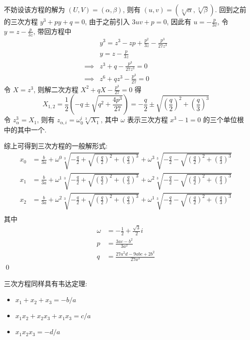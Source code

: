 \begin{solution}
不妨设该方程的解为 $(U, V) = (\alpha, \beta)$, 则有 $(u, v) = (\sqrt[3]{\alpha}, \sqrt[3]{\beta})$. 回到之前的三次方程 $y^3 + py + q = 0$, 由于之前引入 $3uv + p = 0$, 因此有 $u = -\frac{p}{3v}$, 令 $y = z - \frac{p}{3z}$, 带回方程中
\[ \begin{aligned}
    & y^3 = z^3 - zp + \frac{p^2}{3z} - \frac{p^3}{27z^3} \\
    & y = z - \frac{p}{3z} \\
    \implies & z^3 + q - \frac{p^3}{27z^3} = 0 \\
    \implies & z^6 + qz^3 - \frac{p^3}{27} = 0
\end{aligned} \]
令 $X = z^3$, 则解二次方程 $X^2 + qX - \frac{p^3}{27} = 0$ 得
\[
X_{1, 2} = \frac12 (-q \pm \sqrt{q^2 + \frac{4p^3}{27}}) = -\frac{q}{2} \pm \sqrt{(\frac{q}{2})^2 + (\frac{q}{3})^3}
\]
令 $z_\alpha^3 = X_1$, 则有 $z_{\alpha, i} = \omega^i_0 \sqrt[3]{X_1}$, 其中 $\omega$ 表示三次方程 $x^3-1 = 0$ 的三个单位根中的其中一个.

综上可得到三次方程的一般解形式:
\[ \begin{aligned}
    x_0 &= \frac{b}{3a} + \omega^{0} \sqrt[3]{-\frac{q}{2}+\sqrt{(\frac{q}{2})^2 + (\frac{q}{3})^3}} + \omega^{3} \sqrt[3]{-\frac{q}{2}-\sqrt{(\frac{q}{2})^2 + (\frac{q}{3})^3}} \\
    x_1 &= \frac{b}{3a} + \omega^{1} \sqrt[3]{-\frac{q}{2}+\sqrt{(\frac{q}{2})^2 + (\frac{q}{3})^3}} + \omega^{2} \sqrt[3]{-\frac{q}{2}-\sqrt{(\frac{q}{2})^2 + (\frac{q}{3})^3}} \\
    x_2 &= \frac{b}{3a} + \omega^{2} \sqrt[3]{-\frac{q}{2}+\sqrt{(\frac{q}{2})^2 + (\frac{q}{3})^3}} + \omega^{1} \sqrt[3]{-\frac{q}{2}-\sqrt{(\frac{q}{2})^2 + (\frac{q}{3})^3}} \\   
\end{aligned} \]
其中
\[ \begin{aligned}
\omega &= -\frac{1}{2} + \frac{\sqrt{3}}{2} i \\
p &= \frac{3ac-b^2}{3a^2} \\
q &= \frac{27a^2d - 9abc + 2b^2}{27a^3}
\end{aligned} \]
\qed
\end{solution}

三次方程同样具有韦达定理:
\begin{itemize}
\item $x_1 + x_2 + x_3 = -b/a$
\item $x_1 x_2 + x_2 x_3 + x_1 x_3 = c/a$
\item $x_1 x_2 x_3 = -d/a$
\end{itemize}
\endinput
